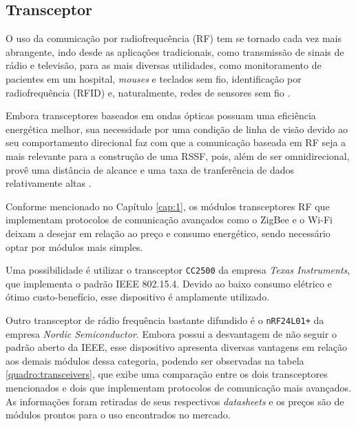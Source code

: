 \subsection{Transceptor}
O uso da comunicação por radiofrequcência (RF) tem se tornado cada vez mais abrangente, indo desde as
aplicações tradicionais, como transmissão de sinais de rádio e televisão, para as mais diversas utilidades,
como monitoramento de pacientes em um hospital, \textit{mouses} e teclados sem fio, identificação por
radiofrequência (RFID) e, naturalmente, redes de sensores sem fio \cite{misra2001}.

Embora transceptores baseados em ondas ópticas possuam uma eficiência energética melhor, sua necessidade por
uma condição de linha de visão devido ao seu comportamento direcional faz com que a comunicação baseada em RF
seja a mais relevante para a construção de uma RSSF, pois, além de ser omnidirecional, provê uma distância de
alcance e uma taxa de tranferência de dados relativamente altas \cite{kuorilehto2007,karl_willig2005}.

Conforme mencionado no Capítulo \ref{cap:1}, os módulos transceptores RF que implementam protocolos de
comunicação avançados como o ZigBee e o Wi-Fi deixam a desejar em relação ao preço e consumo energético,
sendo necessário optar por módulos mais simples.

Uma possibilidade é utilizar o transceptor \texttt{CC2500} da empresa \textit{Texas Instruments}, que
implementa o padrão IEEE 802.15.4. Devido ao baixo consumo elétrico e ótimo custo-benefício, esse dispositivo
é amplamente utilizado.

Outro transceptor de rádio frequência bastante difundido é o \texttt{nRF24L01+} da empresa \textit{Nordic
Semiconductor}. Embora possui a desvantagem de não seguir o padrão aberto da IEEE, esse dispositivo apresenta
diversas vantagens em relação aos demais módulos dessa categoria, podendo ser observadas na tabela
\ref{quadro:transceivers}, que exibe uma comparação entre os dois transceptores mencionados e dois que
implementam protocolos de comunicação mais avançados. As informações foram retiradas de seus respectivos
\textit{datasheets} e os preços são de módulos prontos para o uso encontrados no mercado.

